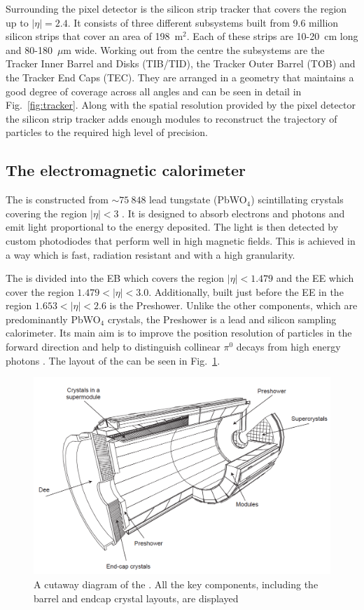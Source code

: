Surrounding the pixel detector is the silicon strip tracker that
covers the region up to $|\eta|=2.4$. It consists of three different
subsystems built from 9.6 million silicon strips that cover an area of
198~m$^2$. Each of these strips are 10-20~cm long and 80-180~$\mu$m
wide. Working out from the centre the subsystems are the
Tracker Inner Barrel and Disks (TIB/TID), the Tracker Outer Barrel
(TOB) and the Tracker End Caps (TEC). They are arranged in a geometry
that maintains a good degree of coverage across all angles and can be
seen in detail in Fig.~\ref{fig:tracker}. Along with the spatial
resolution provided by the pixel detector the silicon strip tracker
adds enough modules to reconstruct the trajectory of particles to the
required high level of precision.

\subsection{The electromagnetic calorimeter} 

The \ECAL is constructed from $\sim 75~848$ lead tungstate (PbWO$_4$)
scintillating crystals covering the region $|\eta|<3$ \cite{CMS:1997ema}. It is
designed to absorb electrons and photons and emit light proportional to the
energy deposited. The light is then detected by custom photodiodes that
perform well in high magnetic fields. This is achieved in a way which
is fast, radiation resistant and with a high granularity. 

The \ECAL is divided into the \ac{EB} which covers the region
$|\eta|<1.479$ and the \ac{EE} which cover the region
$1.479<|\eta|<3.0$. Additionally, built just before the \ac{EE} in the
region $1.653<|\eta|<2.6$ is the Preshower. Unlike the other
components, which are predominantly PbWO$_4$ crystals, the Preshower is
a lead and silicon sampling calorimeter. Its main aim is to improve
the position resolution of particles in the forward direction and help
to distinguish collinear $\pi^0$ decays from high energy photons
\cite{Chatrchyan:2008aa}. The layout of the \ECAL can be seen in
Fig.~\ref{fig:ecal}.

\begin{figure}
\begin{center}
\includegraphics[width=0.8\linewidth]{figs/ecal_colorless} \end{center}
\caption{ A cutaway diagram of the \CMS \ECAL. All the key components,
including the barrel and endcap crystal layouts, are displayed
\cite{Chatrchyan:2008aa}}
\label{fig:ecal} \end{figure}

